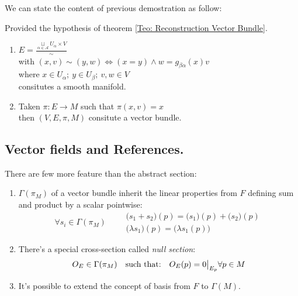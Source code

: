 \documentclass[a4paper,12pt]{scrartcl}    %
\begin{document}
We can state the content of previous demostration as follow:
\begin{corollary}
	\begin{hypothesis}
		Provided the hypothesis of theorem \ref{Teo: Reconstruction Vector Bundle}.
	\end{hypothesis}
	\begin{thesis}
	\begin{enumerate}
	\item $E=\frac{\underset{\alpha \in \mathcal{A}}{\sqcup}U_{\alpha}\times V}{\sim}$ \\ with $(x,v) \sim (y,w) \Leftrightarrow (x=y) \wedge w= g_{\beta \alpha}(x)v$ \\where $ x\in U_{\alpha};\: y \in U_{\beta};\: v,w \in V$
	\\ consitutes a smooth manifold.
	\item Taken $\pi: E \rightarrow M$ such that $\pi(x,v) =x$ \\ then $(V,E,\pi,M)$ consitute a vector bundle.
	\end{enumerate}
	\end{thesis}
\end{corollary}

\subsection{Vector fields and References.}
There are few more feature than the abstract section:
\begin{enumerate}
	\item $\Gamma(\pi_M)$ of a vector bundle inherit the linear properties from $F$ defining sum and product by a 	scalar pointwise:
		\begin{displaymath}
			\forall s_i \in \Gamma(\pi_M) \qquad
            	   \begin{array}{ll}
                  \big( s_1 + s_2 \big) (p) = \big( s_1 \big) (p) + \big( s_2 \big) (p) \\
                  \big( \lambda s_1 \big) (p) = \big( \lambda s_1 (p) \big)
                \end{array}
		\end{displaymath}
	\item There's a special cross-section called \emph{null section}:
		\begin{displaymath}
			O_{E} \in \Gamma(\pi_M) \quad \textrm{such that:} \quad O_{E}(p) = 0\big\vert_{\small E_p} \forall p\in M
		\end{displaymath}			
	\item It's possible to extend the concept of basis from $F$ to $\Gamma(M)$.
\end{enumerate}
\end{document}
